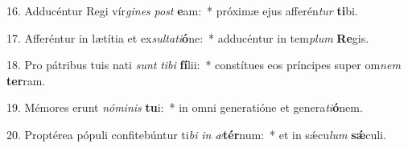 16. Adducéntur Regi vír\textit{gi}\textit{nes} \textit{post} \textbf{e}am:~*  próximæ ejus afferén\textit{tur} \textbf{ti}bi.\

17. Afferéntur in lætítia et ex\textit{sul}\textit{ta}\textit{ti}\textbf{ó}ne:~*  adducéntur in tem\textit{plum} \textbf{Re}gis.\

18. Pro pátribus tuis nati \textit{sunt} \textit{ti}\textit{bi} \textbf{fí}lii:~*  constítues eos príncipes super om\textit{nem} \textbf{ter}ram.\

19. Mémores erunt \textit{nó}\textit{mi}\textit{nis} \textbf{tu}i:~*  in omni generatióne et genera\textit{ti}\textbf{ó}nem.\

20. Proptérea pópuli confitebúntur ti\textit{bi} \textit{in} \textit{æ}\textbf{tér}num:~*  et in sǽcu\textit{lum} \textbf{sǽ}culi.\

